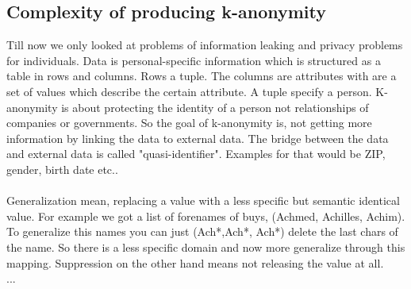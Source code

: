 \documentclass{llncs}
\begin{document}
\subsection{Complexity of producing k-anonymity}
Till now we only looked at problems of information leaking and privacy problems for individuals. Data is personal-specific information which is structured as a table in rows and columns. Rows a tuple. The columns are attributes with are a set of values which describe the certain attribute. A tuple specify a person. K-anonymity is about protecting the identity of a person not relationships of companies or governments. So the goal of k-anonymity is, not getting more information by linking the data to external data. The bridge between the data and external data is called "quasi-identifier". Examples for that would be ZIP, gender, birth date etc.. \\
\\
Generalization mean, replacing a value with a less specific but semantic identical value. For example we got a list of forenames of buys, (Achmed, Achilles, Achim). To generalize this names you can just (Ach*,Ach*, Ach*) delete the last chars of the name. So there is a less specific domain and now more generalize through this mapping. Suppression on the other hand means not releasing the value at all.
\\...
%
\end{document}
